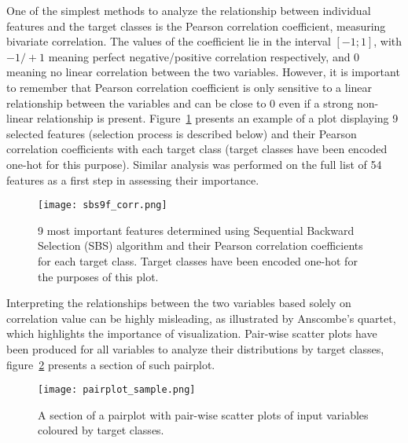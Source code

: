 One of the simplest methods to analyze the relationship between individual features and the target classes is the Pearson correlation coefficient, measuring bivariate correlation.
The values of the coefficient lie in the interval $[-1; 1]$, with $-1/+1$ meaning perfect negative/positive correlation respectively, and 0 meaning no linear correlation between the two variables.
However, it is important to remember that Pearson correlation coefficient is only sensitive to a linear relationship between the variables and can be close to 0 even if a strong non-linear relationship is present.
Figure~\ref{fig:sbs9f_corr} presents an example of a plot displaying 9 selected features (selection process is described below) and their Pearson correlation coefficients with each target class (target classes have been encoded one-hot for this purpose).
Similar analysis was performed on the full list of 54 features as a first step in assessing their importance.

\begin{figure}[hbt!]
    \centering
    \texttt{[image: sbs9f\_corr.png]}
    \caption{9 most important features determined using Sequential Backward Selection (SBS) algorithm and their Pearson correlation coefficients for each target class.
    Target classes have been encoded one-hot for the purposes of this plot.}
    \label{fig:sbs9f_corr}
\end{figure}

Interpreting the relationships between the two variables based solely on correlation value can be highly misleading, as illustrated by Anscombe's quartet\cite{Anscombe1973}, which highlights the importance of visualization.
Pair-wise scatter plots have been produced for all variables to analyze their distributions by target classes, figure~\ref{fig:pairplot_sample} presents a section of such pairplot.

\begin{figure}[hbt!]
    \centering
    \texttt{[image: pairplot\_sample.png]}
    \caption{A section of a pairplot with pair-wise scatter plots of input variables coloured by target classes.}
    \label{fig:pairplot_sample}
\end{figure}
